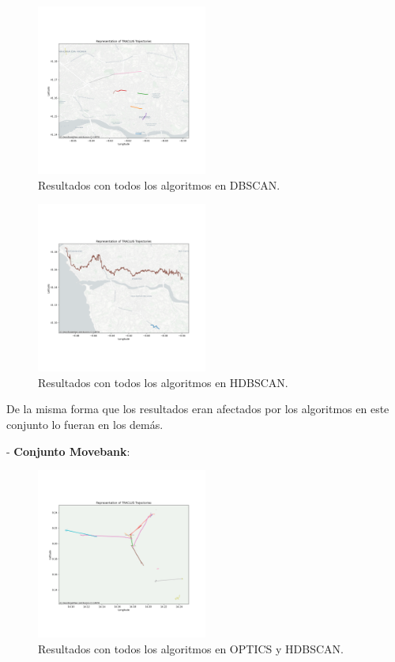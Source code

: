 \begin{figure}[h!]
    \centering
    \includegraphics[width=0.5\textwidth]{img/Taxis/map_dbscan_auto.png}
    \caption{Resultados con todos los algoritmos en DBSCAN.}
    \label{fig:taxis_algorith_dbscan}
\end{figure}

\FloatBarrier

\begin{figure}[h!]
    \centering
    \includegraphics[width=0.5\textwidth]{img/Taxis/map_hdbscan_auto.png}
    \caption{Resultados con todos los algoritmos en HDBSCAN.}
    \label{fig:taxis_algorith_hdbscan}
\end{figure}

\FloatBarrier

De la misma forma que los resultados eran afectados por los algoritmos en este conjunto lo fueran en los demás.

- \textbf{Conjunto Movebank}: 


\begin{figure}[h!]
    \centering
    \includegraphics[width=0.5\textwidth]{img/Movebank/map_optics_auto.png}
    \caption{Resultados con todos los algoritmos en OPTICS y HDBSCAN.}
    \label{fig:movebank_algorith_optics}
\end{figure}

